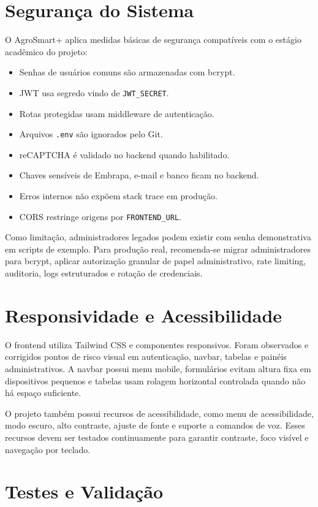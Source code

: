 \documentclass[
  12pt,
  oneside,
  a4paper,
  brazil
]{abntex2}
\begin{document}
\chapter{Segurança do Sistema}

O AgroSmart+ aplica medidas básicas de segurança compatíveis com o estágio acadêmico do projeto:

\begin{itemize}
  \item Senhas de usuários comuns são armazenadas com bcrypt.
  \item JWT usa segredo vindo de \texttt{JWT\_SECRET}.
  \item Rotas protegidas usam middleware de autenticação.
  \item Arquivos \texttt{.env} são ignorados pelo Git.
  \item reCAPTCHA é validado no backend quando habilitado.
  \item Chaves sensíveis de Embrapa, e-mail e banco ficam no backend.
  \item Erros internos não expõem stack trace em produção.
  \item CORS restringe origens por \texttt{FRONTEND\_URL}.
\end{itemize}

Como limitação, administradores legados podem existir com senha demonstrativa em scripts de exemplo. Para produção real, recomenda-se migrar administradores para bcrypt, aplicar autorização granular de papel administrativo, rate limiting, auditoria, logs estruturados e rotação de credenciais.

\chapter{Responsividade e Acessibilidade}

O frontend utiliza Tailwind CSS e componentes responsivos. Foram observados e corrigidos pontos de risco visual em autenticação, navbar, tabelas e painéis administrativos. A navbar possui menu mobile, formulários evitam altura fixa em dispositivos pequenos e tabelas usam rolagem horizontal controlada quando não há espaço suficiente.

O projeto também possui recursos de acessibilidade, como menu de acessibilidade, modo escuro, alto contraste, ajuste de fonte e suporte a comandos de voz. Esses recursos devem ser testados continuamente para garantir contraste, foco visível e navegação por teclado.

\chapter{Testes e Validação}
\end{document}
